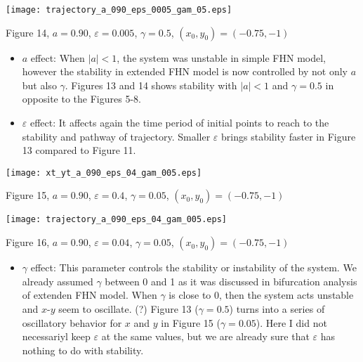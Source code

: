 \documentclass{article}
\begin{document}
\begin{center}
\texttt{[image: trajectory\_a\_090\_eps\_0005\_gam\_05.eps]}
\begin{footnotesize}
 Figure 14,  $a=0.90$, $\varepsilon=0.005$, $\gamma=0.5$,  $(x_0,y_0)=(-0.75,-1)$  
\end{footnotesize}
\end{center}

\begin{itemize}

 \item $a$ effect: When $|a|<1$, the system was unstable in simple FHN model, however the stability in extended FHN model is now controlled by not only $a$ but also $\gamma$.  Figures 13 and 14 shows stability with $|a|<1$ and $\gamma=0.5$ in opposite to the Figures 5-8. 
 
\item $\varepsilon$ effect: It affects again the time period of initial points to reach to the stability and pathway of trajectory. Smaller $\varepsilon$ brings stability faster in Figure 13 compared to Figure 11. 
\end{itemize}

\begin{center}
\texttt{[image: xt\_yt\_a\_090\_eps\_04\_gam\_005.eps]}
\begin{footnotesize}
 Figure 15, $a=0.90$, $\varepsilon=0.4$, $\gamma=0.05$,  $(x_0,y_0)=(-0.75,-1)$ 
\end{footnotesize}
\end{center}

\begin{center}
\texttt{[image: trajectory\_a\_090\_eps\_04\_gam\_005.eps]}
\begin{footnotesize}
 Figure 16,  $a=0.90$, $\varepsilon=0.04$, $\gamma=0.05$,  $(x_0,y_0)=(-0.75,-1)$  
\end{footnotesize}
\end{center}

\begin{itemize}

 \item $\gamma$ effect: This parameter controls the stability or instability of the system. We already assumed $\gamma$ between 0 and 1 as it was discussed in bifurcation analysis of extenden FHN model. When $\gamma$ is close to 0, then the system acts unstable and $x$-$y$ seem to oscillate. (?)  Figure 13 ($\gamma=0.5$) turns into a series of oscillatory behavior for $x$ and $y$ in Figure 15 ($\gamma=0.05$).  Here I did not necessariyl keep $\varepsilon$ at the same values, but we are already sure that $\varepsilon$ has nothing to do with stability.
\end{itemize}
\newpage
\end{document}
